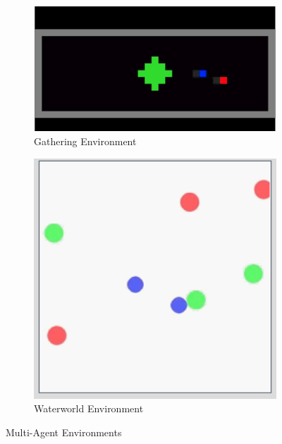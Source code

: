 \documentclass[12pt, letter]{article}
\begin{document}
\begin{figure}[htbp]
			\centering
			\begin{subfigure}[b]{0.5\textwidth}
				\includegraphics[width=1\textwidth]{figures/gath.png}
				\caption{Gathering Environment}
				\label{fig:Gather}
			\end{subfigure}
			\begin{subfigure}[b]{0.25\textwidth}
				\includegraphics[width=1\textwidth]{figures/water.png}
				\caption{Waterworld Environment}
				\label{fig:water}
			\end{subfigure}
			\caption{Multi-Agent Environments}
			\label{fig:environments}
\end{figure}
		
\end{document}
